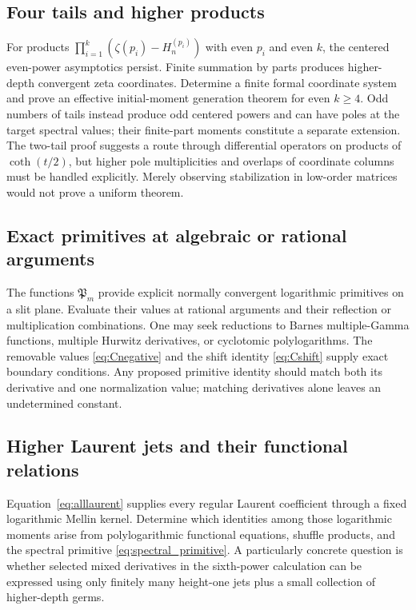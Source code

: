 \documentclass[11pt,a4paper]{article}
\numberwithin{equation}{section}
\theoremstyle{definition}
\begin{document}
\subsection{Four tails and higher products}

For products $\prod_{i=1}^k(\zeta(p_i)-H_n^{(p_i)})$ with even
$p_i$ and even $k$, the centered even-power asymptotics persist.
Finite summation by
parts produces higher-depth convergent zeta coordinates. Determine a
finite formal coordinate system and prove an effective initial-moment
generation theorem for even $k\ge4$. Odd numbers of tails instead
produce odd centered powers and can have poles at the target spectral
values; their finite-part moments constitute a separate extension.
The two-tail proof suggests a route
through differential operators on products of $\coth(t/2)$, but
higher pole multiplicities and overlaps of coordinate columns must
be handled explicitly. Merely observing stabilization in low-order
matrices would not prove a uniform theorem.

\subsection{Exact primitives at algebraic or rational arguments}

The functions $\mathfrak P_m$ provide explicit normally convergent
logarithmic primitives on a slit plane. Evaluate their values at
rational arguments and their reflection or multiplication combinations.
One may seek reductions to Barnes multiple-Gamma functions, multiple
Hurwitz derivatives, or cyclotomic polylogarithms. The removable values
\eqref{eq:Cnegative} and the shift identity \eqref{eq:Cshift} supply
exact boundary conditions. Any proposed primitive identity should
match both its derivative and one normalization value; matching
derivatives alone leaves an undetermined constant.

\subsection{Higher Laurent jets and their functional relations}

Equation~\eqref{eq:alllaurent} supplies every regular Laurent
coefficient through a fixed logarithmic Mellin kernel. Determine
which identities among those logarithmic moments arise from
polylogarithmic functional equations, shuffle products, and the
spectral primitive \eqref{eq:spectral_primitive}. A particularly
concrete question is whether selected mixed derivatives in the
sixth-power calculation can be expressed using only finitely many
height-one jets plus a small collection of higher-depth germs.
\end{document}
